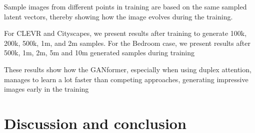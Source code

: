 \documentclass{article}
\begin{document}
	Sample images from different points in training are based on the same sampled latent vectors, 
	thereby showing how the image evolves during the training.
	
	
	For CLEVR and Cityscapes, we present results after training to generate 100k, 200k, 500k, 1m, and 
	2m samples. For the Bedroom case, we present results after 500k, 1m, 2m, 5m and 10m generated 
	samples during training
	
	These results show how the GANformer, especially when using duplex attention, manages to learn a 
	lot faster than competing approaches, generating impressive images early in the training
	
	\section{Discussion and conclusion}
	
	
	
	\nocite{*} %
	
	
	\clearpage
	
\end{document}
